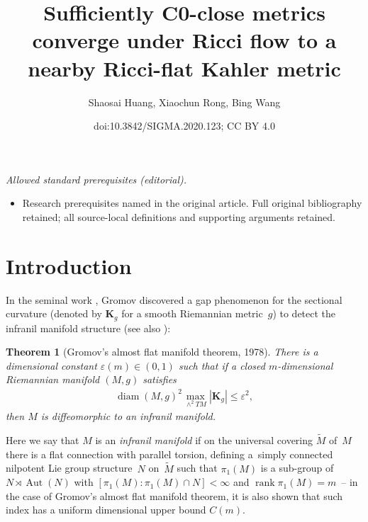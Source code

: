 \documentclass[10pt,a4paper]{amsart}
\title{Sufficiently C0-close metrics converge under Ricci flow to a nearby Ricci-flat Kahler metric}
\author{Shaosai Huang, Xiaochun Rong, Bing Wang}
\date{doi:10.3842/SIGMA.2020.123; CC BY 4.0}
\numberwithin{equation}{section}
\newtheorem{Theorem}{Theorem}[section]
\DeclareMathOperator{\diam}{diam}
\newcommand{\rank}{\operatorname{rank}}
\begin{document}
\maketitle
\noindent\textit{Allowed standard prerequisites (editorial).}\begin{itemize}
\item Research prerequisites named in the original article. Full original bibliography retained; all source-local definitions and supporting arguments retained.
\end{itemize}\medskip
\section{Introduction}
In the seminal work \cite{Gromov78b}, Gromov discovered a gap phenomenon for the
sectional curvature (denoted by $\mathbf{K}_g$ for a smooth Riemannian metric~$g$) to detect the infranil manifold structure (see also \cite{BK81, Ruh82}):

\begin{Theorem}[Gromov's almost flat manifold theorem, 1978]\label{thm:
Gromov78}
There is a dimensional constant $\varepsilon(m)\in (0,1)$
such that if a closed $m$-dimensional Riemannian manifold $(M,g)$ satisfies
\begin{gather}\label{eqn: AF_Rm}
\diam(M,g)^2\max_{\wedge^2TM} |\mathbf{K}_{g} | \le \varepsilon^2 ,
\end{gather}
then $M$ is diffeomorphic to an infranil manifold.
\end{Theorem}
Here we say that $M$ is an \emph{infranil manifold} if on the universal covering
$\tilde{M}$ of~$M$ there is a flat connection with parallel torsion, defining a~simply connected nilpotent Lie group structure~$N$ on~$\tilde{M}$ such that
$\pi_1(M)$ is a sub-group of $N\rtimes \operatorname{Aut}(N)$ with
$ [\pi_1(M)\colon \pi_1(M)\cap N ]<\infty$ and $\rank \pi_1(M)=m$~-- in the case of Gromov's
almost flat manifold theorem, it is also shown that such index has a uniform
dimensional upper bound $C(m)$.
\end{document}
